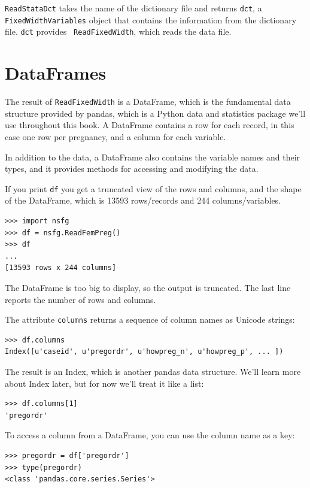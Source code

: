 \documentclass[12pt]{book}
\begin{document}
{\tt ReadStataDct} takes the name of the dictionary file
and returns {\tt dct}, a {\tt FixedWidthVariables} object that contains the
information from the dictionary file.  {\tt dct} provides {\tt
  ReadFixedWidth}, which reads the data file.


\section{DataFrames}
\label{dataframe}

The result of {\tt ReadFixedWidth} is a DataFrame, which is the
fundamental data structure provided by pandas, which is a Python
data and statistics package we'll use throughout this book.
A DataFrame contains a
row for each record, in this case one row per pregnancy, and a column
for each variable.

In addition to the data, a DataFrame also contains the variable
names and their types, and it provides methods for accessing and modifying
the data.

If you print {\tt df} you get a truncated view of the rows and
columns, and the shape of the DataFrame, which is 13593
rows/records and 244 columns/variables.

\begin{verbatim}
>>> import nsfg
>>> df = nsfg.ReadFemPreg()
>>> df
...
[13593 rows x 244 columns]
\end{verbatim}

The DataFrame is too big to display, so the output is truncated.  The
last line reports the number of rows and columns.

The attribute {\tt columns} returns a sequence of column
names as Unicode strings:

\begin{verbatim}
>>> df.columns
Index([u'caseid', u'pregordr', u'howpreg_n', u'howpreg_p', ... ])
\end{verbatim}

The result is an Index, which is another pandas data structure.  
We'll learn more about Index later, but for
now we'll treat it like a list:

\begin{verbatim}
>>> df.columns[1]
'pregordr'
\end{verbatim}

To access a column from a DataFrame, you can use the column
name as a key:

\begin{verbatim}
>>> pregordr = df['pregordr']
>>> type(pregordr)
<class 'pandas.core.series.Series'>
\end{verbatim}
\end{document}
